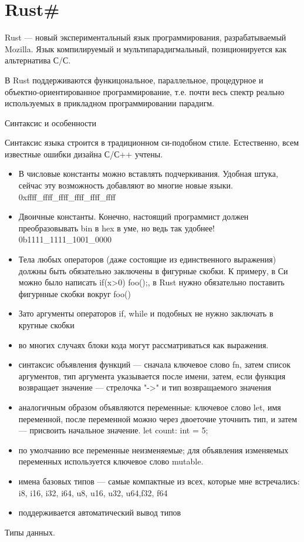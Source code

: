\documentclass[12pt]{article}
\begin{document}
  
\section*{Rust\#} 
Rust — новый экспериментальный язык программирования, разрабатываемый Mozilla. Язык компилируемый и мультипарадигмальный, позиционируется как альтернатива С/С. 

В Rust поддерживаются функицональное, параллельное, процедурное и объектно-ориентированное программирование, т.е. почти весь спектр реально используемых в прикладном программировании парадигм.

Синтаксис и особенности

Синтаксис языка строится в традиционном си-подобном стиле. Естественно, всем известные ошибки дизайна С/С++ учтены.
\begin{itemize}
\item	В числовые константы можно вставлять подчеркивания. Удобная штука, сейчас эту возможность добавляют во многие новые языки. 0xffff\_ffff\_ffff\_ffff\_ffff\_ffff
\item	Двоичные константы. Конечно, настоящий программист должен преобразовывать bin в hex в уме, но ведь так удобнее! 0b1111\_1111\_1001\_0000 
\item	Тела любых операторов (даже состоящие из единственного выражения) должны быть обязательно заключены в фигурные скобки. К примеру, в Си можно было написать if(x>0) foo();, в Rust нужно обязательно поставить фигурнные скобки вокруг foo() 
\item	Зато аргументы операторов if, while и подобных не нужно заключать в кругные скобки 
\item	во многих случаях блоки кода могут рассматриваться как выражения.
\item	синтаксис объявления функций — сначала ключевое слово fn, затем список аргументов, тип аргумента указывается после имени, затем, если функция возвращает значение — стрелочка "->" и тип возвращаемого значения 
\item	аналогичным образом объявляются переменные: ключевое слово let, имя переменной, после переменной можно через двоеточие уточнить тип, и затем — присвоить начальное значение.
let count: int = 5; 
\item	по умолчанию все переменные неизменяемые; для объявления изменяемых переменных используется ключевое слово mutable. 
\item	имена базовых типов — самые компактные из всех, которые мне встречались: i8, i16, i32, i64, u8, u16, u32, u64,f32, f64
\item	поддерживается автоматический вывод типов
\end{itemize}
Типы данных. 
\end{document}
